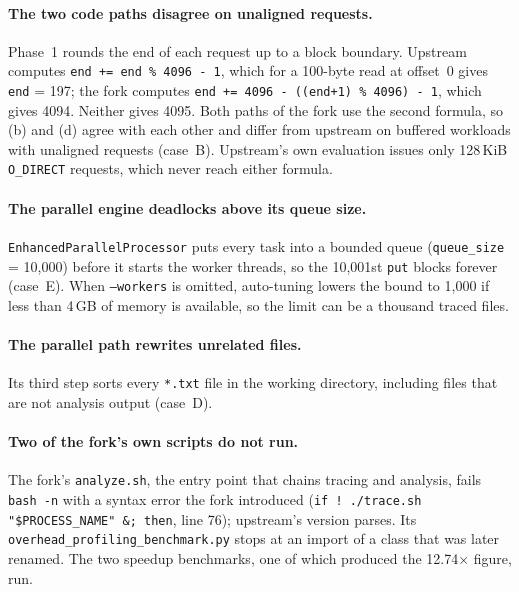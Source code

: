\paragraph{The two code paths disagree on unaligned requests.}
Phase~1 rounds the end of each request up to a block boundary. Upstream computes
\texttt{end += end \% 4096 - 1}, which for a 100-byte read at offset~0 gives
\texttt{end} = 197; the fork computes \texttt{end += 4096 - ((end+1) \% 4096) - 1},
which gives 4094. Neither gives 4095. Both paths of the fork use the second formula,
so (b) and (d) agree with each other and differ from upstream on buffered workloads
with unaligned requests (case~B). Upstream's own evaluation issues only 128\,KiB
\texttt{O\_DIRECT} requests, which never reach either formula.

\paragraph{The parallel engine deadlocks above its queue size.}
\texttt{EnhancedParallel\allowbreak Processor} puts every task into a bounded queue
(\texttt{queue\_size} = 10{,}000) before it starts the worker threads, so the
10{,}001st \texttt{put} blocks forever (case~E). When \texttt{--workers} is omitted,
auto-tuning lowers the bound to 1{,}000 if less than 4\,GB of memory is available,
so the limit can be a thousand traced files.

\paragraph{The parallel path rewrites unrelated files.}
Its third step sorts every \texttt{*.txt} file in the working directory, including
files that are not analysis output (case~D).

\paragraph{Two of the fork's own scripts do not run.} The fork's \texttt{analyze.sh},
the entry point that chains tracing and analysis, fails \texttt{bash -n} with a syntax
error the fork introduced (\texttt{if ! ./trace.sh "\$PROCESS\_NAME" \&; then}, line
76); upstream's version parses. Its \texttt{overhead\_profiling\_\allowbreak benchmark.py} stops
at an import of a class that was later renamed. The two speedup benchmarks, one of
which produced the 12.74$\times$ figure, run.

